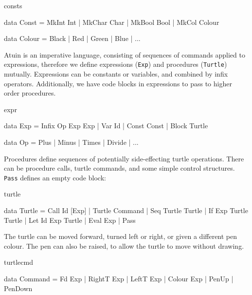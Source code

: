 \begin{SaveVerbatim}{consts}

data Const = MkInt Int
           | MkChar Char
           | MkBool Bool
           | MkCol Colour

data Colour = Black | Red | Green | Blue | ...

\end{SaveVerbatim}

\noindent
Atuin is an imperative language, consisting of sequences of commands
applied to expressions, therefore we define expressions (\texttt{Exp})
and procedures (\texttt{Turtle}) mutually. Expressions can be constants
or variables, and combined by infix operators. Additionally, we have
code blocks in expressions to pass to higher order procedures.

\begin{SaveVerbatim}{expr}

data Exp = Infix Op Exp Exp
         | Var Id
         | Const Const
         | Block Turtle

data Op = Plus | Minus | Times  | Divide | ...

\end{SaveVerbatim}

\noindent
Procedures define sequences of potentially side-effecting turtle
operations. There can be procedure calls, turtle commands, and some
simple control structures. \texttt{Pass} defines an empty code block:

\begin{SaveVerbatim}{turtle}

data Turtle = Call Id [Exp]
            | Turtle Command
            | Seq Turtle Turtle
            | If Exp Turtle Turtle
            | Let Id Exp Turtle
            | Eval Exp
            | Pass

\end{SaveVerbatim}

\noindent
The turtle can be moved forward, turned left or right, or given a
different pen colour. The pen can also be raised, to allow the turtle
to move without drawing.

\begin{SaveVerbatim}{turtlecmd}

data Command = Fd Exp     | RightT Exp | LeftT Exp
             | Colour Exp | PenUp      | PenDown

\end{SaveVerbatim}

